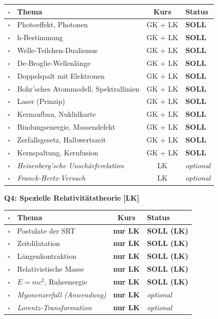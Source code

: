\documentclass[11pt,a4paper]{article}
\newcommand{\lmark}{\textcolor{accentorange}{\textbf{[LK]}}}
\newcommand{\checkbox}{$\square$}
\begin{document}
\begin{tabularx}{\textwidth}{c|l|c|X}
\rowcolor{lightblue}
\checkbox & \textbf{Thema} & \textbf{Kurs} & \textbf{Status} \\
\hline
\checkbox & Photoeffekt, Photonen & GK + LK & \textbf{SOLL} \\
\rowcolor{lightgray}
\checkbox & h-Bestimmung & GK + LK & \textbf{SOLL} \\
\checkbox & Welle-Teilchen-Dualismus & GK + LK & \textbf{SOLL} \\
\rowcolor{lightgray}
\checkbox & De-Broglie-Wellenlänge & GK + LK & \textbf{SOLL} \\
\checkbox & Doppelspalt mit Elektronen & GK + LK & \textbf{SOLL} \\
\rowcolor{lightgray}
\checkbox & Bohr'sches Atommodell, Spektrallinien & GK + LK & \textbf{SOLL} \\
\checkbox & Laser (Prinzip) & GK + LK & \textbf{SOLL} \\
\rowcolor{lightgray}
\checkbox & Kernaufbau, Nuklidkarte & GK + LK & \textbf{SOLL} \\
\checkbox & Bindungsenergie, Massendefekt & GK + LK & \textbf{SOLL} \\
\rowcolor{lightgray}
\checkbox & Zerfallsgesetz, Halbwertszeit & GK + LK & \textbf{SOLL} \\
\checkbox & Kernspaltung, Kernfusion & GK + LK & \textbf{SOLL} \\
\rowcolor{lightgray}
\checkbox & \textit{Heisenberg'sche Unschärferelation} & LK & \textit{optional} \\
\checkbox & \textit{Franck-Hertz-Versuch} & LK & \textit{optional} \\
\hline
\end{tabularx}

\vspace{0.4cm}

\begin{center}
\textbf{Q4: Spezielle Relativitätstheorie} \lmark{}
\end{center}

\begin{tabularx}{\textwidth}{c|l|c|X}
\rowcolor{lightblue}
\checkbox & \textbf{Thema} & \textbf{Kurs} & \textbf{Status} \\
\hline
\checkbox & Postulate der SRT & \textbf{nur LK} & \textbf{SOLL (LK)} \\
\rowcolor{lightgray}
\checkbox & Zeitdilatation & \textbf{nur LK} & \textbf{SOLL (LK)} \\
\checkbox & Längenkontraktion & \textbf{nur LK} & \textbf{SOLL (LK)} \\
\rowcolor{lightgray}
\checkbox & Relativistische Masse & \textbf{nur LK} & \textbf{SOLL (LK)} \\
\checkbox & $E = mc^2$, Ruheenergie & \textbf{nur LK} & \textbf{SOLL (LK)} \\
\rowcolor{lightgray}
\checkbox & \textit{Myonenzerfall (Anwendung)} & \textbf{nur LK} & \textit{optional} \\
\checkbox & \textit{Lorentz-Transformation} & \textbf{nur LK} & \textit{optional} \\
\hline
\end{tabularx}
\end{document}
